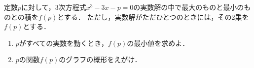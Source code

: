 \documentclass[../../main.tex]{subfiles}
\begin{document}
定数$p$に対して，3次方程式$x^3-3x-p=0$の実数解の中で最大のものと最小のものとの積を$f(p)$とする．
ただし，実数解がただひとつのときには，その2乗を$f(p)$とする．
\begin{enumerate}
  \item $p$がすべての実数を動くとき，$f(p)$の最小値を求めよ．
  \item $p$の関数$f(p)$のグラフの概形をえがけ．
\end{enumerate}
\end{document}
